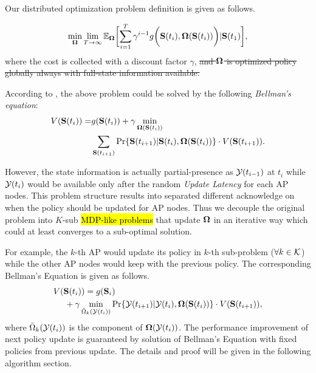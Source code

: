 Our distributed optimization problem definition is given as follows.
\begin{problem}
    \begin{gather}
        \min_{\Policy} \lim_{T \to \infty}
            \mathbb{E}_{\Policy}
                \Bracket{\sum_{i=1}^{T} \gamma^{i-1} g\Paren{\Stat(t_{i}), \Policy(\Stat(t_{i}))}|\Stat(t_1)},
    \end{gather}
    where the cost is collected with a discount factor $\gamma$, \st{and $\boldsymbol{\Omega}$ is optimized policy globally always with full-state information available.}
\end{problem}
According to \cite{sutton1998introduction}, the above problem could be solved by the following \emph{Bellman's equation}:
\begin{align}
    V(\mathbf{S}(t_i)) = &g(\mathbf{S}(t_i)) + \gamma \min_{\boldsymbol{\Omega}(\mathbf{S}(t_{i}))}
        \nonumber\\
        & \sum_{\mathbf{S}(t_{i+1})} \Pr\{ \mathbf{S}(t_{i+1})|\mathbf{S}(t_{i}), \boldsymbol{\Omega}(\mathbf{S}(t_{i})) \} \cdot V(\mathbf{S}(t_{i+1})).
    \label{sp_0}
\end{align}

However, the state information is actually partial-presence as $\mathcal{Y}(t_{i-1})$ at $t_i$ while $\mathcal{Y}(t_{i})$ would be available only after the random \emph{Update Latency} for each AP nodes.
This problem structure results into separated different acknowledge on when the policy should be updated for AP nodes. Thus we decouple the original problem into $K$-sub \hl{MDP-like problems} that update $\boldsymbol{\Omega}$ in an iterative way which could at least converges to a sub-optimal solution.
        
For example, the $k$-th AP would update its policy in $k$-th sub-problem ($\forall k\in\mathcal{K}$) while the other AP nodes would keep with the previous policy. The corresponding Bellman's Equation is given as follows.
\begin{align}
    &V(\mathbf{S}(t_{i})) = g(\mathbf{S}_{i}) 
    \nonumber\\
    &~~~~+ \gamma \min_{\tilde{\Omega}_{k}(\mathcal{Y}(t_{i}))} \Pr\{ \mathcal{Y}(t_{i+1})|\mathcal{Y}(t_{i}), \boldsymbol{\Omega}(\mathbf{S}(t_{i})) \} \cdot V(\mathbf{S}(t_{i+1})),
    \label{sp_k}
\end{align}
where $\tilde{\Omega}_{k}(\mathcal{Y}(t_{i}))$ is the component of $\boldsymbol{\Omega}(\mathcal{Y}(t_{i}))$.
The performance improvement of next policy update is guaranteed by solution of Bellman's Equation with fixed policies from previous update.
The details and proof will be given in the following algorithm section.

